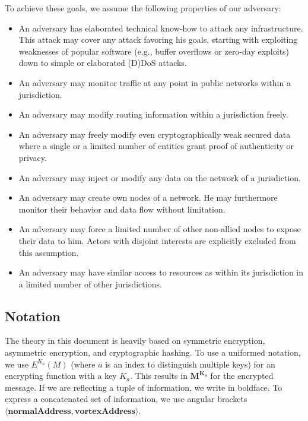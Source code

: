 \documentclass[10pt,journal,compsoc,twocolumn,twoside]{IEEEtran}
\begin{document}
To achieve these goals, we assume the following properties of our adversary:
\begin{itemize}
	\item An adversary has elaborated technical know-how to attack any infrastructure. This attack may cover any attack favoring his goals, starting with exploiting weaknesses of popular software (e.g., buffer overflows or zero-day exploits) down to simple or elaborated (D)DoS attacks.
	\item An adversary may monitor traffic at any point in public networks within a jurisdiction.
	\item An adversary may modify routing information within a jurisdiction freely.
	\item An adversary may freely modify even cryptographically weak secured data where a single or a limited number of entities grant proof of authenticity or privacy.
	\item An adversary may inject or modify any data on the network of a jurisdiction.
	\item An adversary may create own nodes of a network. He may furthermore monitor their behavior and data flow without limitation.
	\item An adversary may force a limited number of other non-allied nodes to expose their data to him. Actors with disjoint interests are explicitly excluded from this assumption.
	\item An adversary may have similar access to resources as within its jurisdiction in a limited number of other jurisdictions.
\end{itemize}


\subsection{Notation \label{sec:encNot}}
The theory in this document is heavily based on symmetric encryption, asymmetric encryption, and cryptographic hashing. To use a uniformed notation, we use $E^{K_a}(M)$ (where $a$ is an index to distinguish multiple keys) for an encrypting function with a key $K_a$. This results in $\mathbf{M^{K_a}}$ for the encrypted message. If we are reflecting a tuple of information, we write in boldface. To express a concatenated set of information, we use angular brackets $\mathbf{\langle normalAddress,vortexAddress\rangle }$. 
\end{document}
